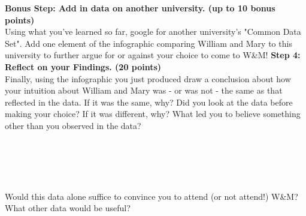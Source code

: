 \documentclass{article}
\begin{document}
\textbf{Bonus Step: Add in data on another university. (up to 10 bonus points)}\\
Using what you've learned so far, google for another university's "Common Data Set".  Add one element of the infographic comparing William and Mary to this university to further argue for or against your choice to come to W\&M!
\vspace{3mm}
\newpage
\textbf{Step 4: Reflect on your Findings. (20 points)}\\
Finally, using the infographic you just produced draw a conclusion about how your intuition about William and Mary was - or was not - the same as that reflected in the data.  If it was the same, why?  Did you look at the data before making your choice?  If it was different, why?  What led you to believe something other than you observed in the data?\\  
\vspace{0.5mm} 
\underline{\hspace{15cm}}\\
\vspace{0.5mm}
\underline{\hspace{15cm}}\\
\vspace{0.5mm}
\underline{\hspace{15cm}}\\
\vspace{0.5mm}
\underline{\hspace{15cm}}\\
\vspace{1.0mm}\\
Would this data alone suffice to convince you to attend (or not attend!) W\&M? What other data would be useful?\\
\vspace{0.5mm} 
\underline{\hspace{15cm}}\\
\vspace{0.5mm}
\underline{\hspace{15cm}}\\
\vspace{0.5mm}
\underline{\hspace{15cm}}\\
\vspace{0.5mm}
\underline{\hspace{15cm}}\\


\end{document}
